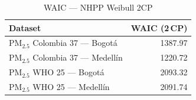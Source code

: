 \begin{table}[htbp]
\centering
\caption{WAIC --- NHPP Weibull 2CP}
\label{tab:nhpp_waic_2cp}
\begin{tabular}{lr}
\toprule
Dataset & WAIC (2\,CP) \\
\midrule
PM$_{2.5}$ Colombia 37 --- Bogot\'{a} & 1387.97 \\
PM$_{2.5}$ Colombia 37 --- Medell\'{i}n & 1220.72 \\
PM$_{2.5}$ WHO 25 --- Bogot\'{a} & 2093.32 \\
PM$_{2.5}$ WHO 25 --- Medell\'{i}n & 2091.74 \\
\bottomrule
\end{tabular}
\end{table}
